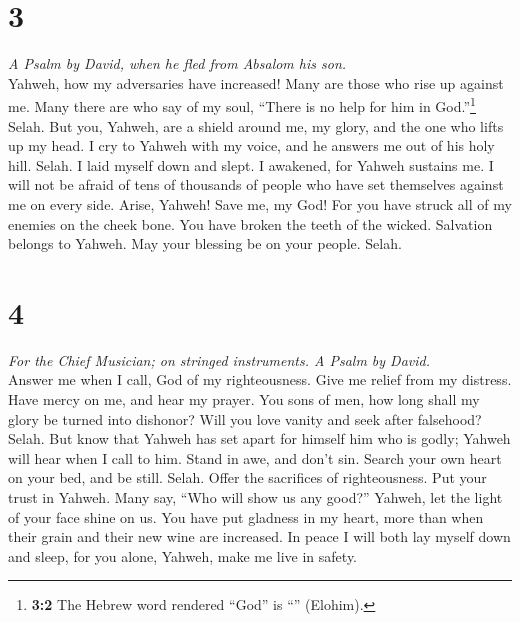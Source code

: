 \hypertarget{section-2}{%
\section{3}\label{section-2}}

\emph{A Psalm by David, when he fled from Absalom his son.}\\
 Yahweh, how my adversaries have increased! Many are those
who rise up against me.  Many there are who say of my
soul, ``There is no help for him in God.''\footnote{\textbf{3:2} The
  Hebrew word rendered ``God'' is ``'' (Elohim).} Selah.
 But you, Yahweh, are a shield around me, my glory, and
the one who lifts up my head.  I cry to Yahweh with my
voice, and he answers me out of his holy hill. Selah.  I
laid myself down and slept. I awakened, for Yahweh sustains me.
 I will not be afraid of tens of thousands of people who
have set themselves against me on every side.  Arise,
Yahweh! Save me, my God! For you have struck all of my enemies on the
cheek bone. You have broken the teeth of the wicked. 
Salvation belongs to Yahweh. May your blessing be on your people. Selah.

\hypertarget{section-3}{%
\section{4}\label{section-3}}

\emph{For the Chief Musician; on stringed instruments. A Psalm by
David.}\\
 Answer me when I call, God of my righteousness. Give me
relief from my distress. Have mercy on me, and hear my prayer.
 You sons of men, how long shall my glory be turned into
dishonor? Will you love vanity and seek after falsehood? Selah.
 But know that Yahweh has set apart for himself him who is
godly; Yahweh will hear when I call to him.  Stand in awe,
and don't sin. Search your own heart on your bed, and be still. Selah.
 Offer the sacrifices of righteousness. Put your trust in
Yahweh.  Many say, ``Who will show us any good?'' Yahweh,
let the light of your face shine on us.  You have put
gladness in my heart, more than when their grain and their new wine are
increased.  In peace I will both lay myself down and
sleep, for you alone, Yahweh, make me live in safety.

